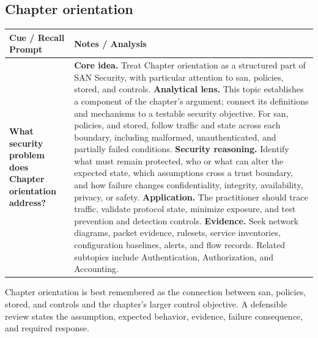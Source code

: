 \documentclass[11pt]{article}
\newcommand{\CornellHeader}{%
\rowcolor{Navy}\color{white}\bfseries Cue / Recall Prompt & \color{white}\bfseries Notes / Analysis\\\hline}
\newcommand{\CornellRow}[2]{%
\cellcolor{CueGray}\RaggedRight\textbf{#1} & \RaggedRight #2\\\hline}
\begin{document}
\subsection*{Chapter orientation}
\begin{longtable}{>{\RaggedRight\arraybackslash}p{}|>{\RaggedRight\arraybackslash}p{}}
\CornellHeader
\CornellRow{What security problem does Chapter orientation address?}{\textbf{Core idea.} Treat Chapter orientation as a structured part of SAN Security, with particular attention to san, policies, stored, and controls. \textbf{Analytical lens.} This topic establishes a component of the chapter's argument; connect its definitions and mechanisms to a testable security objective. For san, policies, and stored, follow traffic and state across each boundary, including malformed, unauthenticated, and partially failed conditions. \textbf{Security reasoning.} Identify what must remain protected, who or what can alter the expected state, which assumptions cross a trust boundary, and how failure changes confidentiality, integrity, availability, privacy, or safety. \textbf{Application.} The practitioner should trace traffic, validate protocol state, minimize exposure, and test prevention and detection controls. \textbf{Evidence.} Seek network diagrams, packet evidence, rulesets, service inventories, configuration baselines, alerts, and flow records. Related subtopics include Authentication, Authorization, and Accounting.}
\end{longtable}
\begin{topicsummary}
Chapter orientation is best remembered as the connection between san, policies, stored, and controls and the chapter's larger control objective. A defensible review states the assumption, expected behavior, evidence, failure consequence, and required response.
\end{topicsummary}
\end{document}
